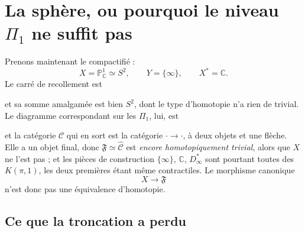 \documentclass[11pt,a4paper]{article}
\begin{document}
\section*{La sphère, ou pourquoi le niveau $\Pi_{1}$ ne suffit pas}

Prenons maintenant le compactifié :
\[
  X = \mathbb{P}^{1}_{\mathbb{C}} \simeq S^{2}, \qquad
  Y = \{\infty\}, \qquad X^{*} = \mathbb{C}.
\]
Le carré de recollement est


et sa somme amalgamée est bien $S^{2}$, dont le type d'homotopie n'a rien de
trivial. Le diagramme correspondant sur les $\Pi_{1}$, lui, est


et la catégorie $\mathcal{C}$ qui en sort est la catégorie
${\cdot} \to {\cdot}$, à deux objets et une flèche. Elle a un objet final, donc
$\mathfrak{F} \simeq \widehat{\mathcal{C}}$ est \emph{encore homotopiquement
trivial}, alors que $X$ ne l'est pas ; et les pièces de construction
$\{\infty\}$, $\mathbb{C}$, $D^{*}_{\infty}$ sont pourtant toutes des
$K(\pi,1)$, les deux premières étant même contractiles. Le morphisme canonique
\[
  X \longrightarrow \mathfrak{F}
\]
n'est donc pas une équivalence d'homotopie.

\subsection*{Ce que la troncation a perdu}
\end{document}
